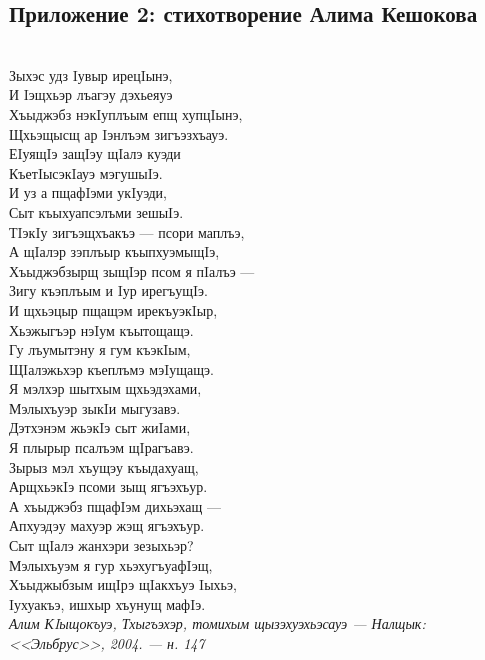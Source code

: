 \subsection{Приложение 2: стихотворение Алима Кешокова}
{~}\medskip\\
\noindent Зыхэс удз Iувыр ирецIынэ,\\
И Iэщхьэр лъагэу дэхьеяуэ\\
Хъыджэбз нэкIуплъым епщ хупцIынэ,\\
Щхьэщысщ ар Iэнлъэм зигъэзхъауэ.\medskip\\
ЕIуящIэ защIэу щIалэ куэди\\
КъетIысэкIауэ мэгушыIэ.\\
И уз а пщафIэми укIуэди,\\
Сыт къыхуапсэлъми зешыIэ.\medskip\\
ТIэкIу зигъэщхъакъэ --- псори маплъэ,\\
А щIалэр зэплъыр къыпхуэмыщIэ,\\
Хъыджэбзырщ зыщIэр псом я пIалъэ ---\\
Зигу къэплъым и Iур ирегъущIэ.\medskip\\
И щхьэцыр пщащэм ирекъуэкIыр,\\
Хьэжыгъэр нэIум къытощащэ.\\
Гу лъумытэну я гум къэкIым,\\
ЩIалэжьхэр къеплъмэ мэIущащэ.\medskip\\
Я мэлхэр шытхым щхьэдэхами,\\
Мэлыхъуэр зыкIи мыгузавэ.\\
Дэтхэнэм жьэкIэ сыт жиIами,\\
Я плырыр псалъэм щIрагъавэ.\medskip\\
Зырыз мэл хъущэу къыдахуащ,\\
АрщхьэкIэ псоми зыщ ягъэхъур.\\
А хъыджэбз пщафIэм дихьэхащ --- \\
Апхуэдэу махуэр жэщ ягъэхъур. \medskip\\
Сыт щIалэ жанхэри зезыхьэр?\\
Мэлыхъуэм я гур хьэхугъуафIэщ,\\
Хъыджыбзым ищIрэ щIакхъуэ Iыхьэ,\\
Iухуакъэ, ишхыр хъунущ мафIэ.\medskip\\
\textit{Алим КIыщокъуэ, Тхыгъэхэр, томихым щызэхуэхьэсауэ ---  Налщык: <<Эльбрус>>, 2004. --- н. 147}
\pagebreak
